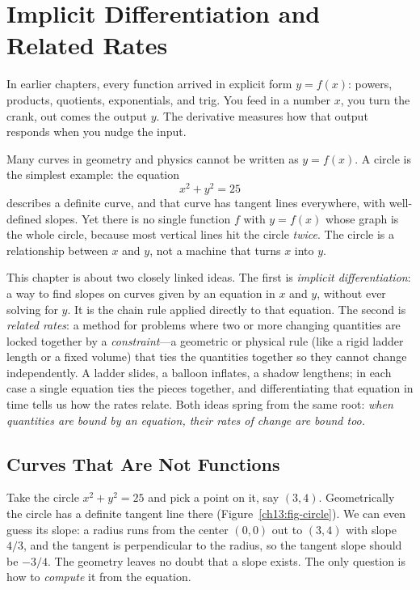 \chapter{Implicit Differentiation and Related Rates}

In earlier chapters, every function arrived in explicit form $y = f(x)$: powers,
products, quotients, exponentials, and trig. You feed in a number $x$, you turn the crank,
out comes the output $y$. The derivative measures how that output responds when you nudge
the input.

Many curves in geometry and physics cannot be written as $y = f(x)$. A circle is the
simplest example: the equation
\[
x^2 + y^2 = 25
\]
describes a definite curve, and that curve has tangent lines everywhere, with
well-defined slopes. Yet there is no single function $f$ with $y = f(x)$ whose graph is the
whole circle, because most vertical lines hit the circle \emph{twice}. The circle is a relationship
between $x$ and $y$, not a machine that turns $x$ into $y$.

This chapter is about two closely linked ideas. The first is \emph{implicit differentiation}: a way
to find slopes on curves given by an equation in $x$ and $y$, without ever solving for $y$. It is
the chain rule applied directly to that equation. The second is
\emph{related rates}: a method for problems where two or more changing quantities are locked together
by a \emph{constraint}---a geometric or physical rule (like a rigid ladder length or a fixed volume)
that ties the quantities together so they cannot change independently. A ladder slides, a balloon
inflates, a shadow lengthens; in each case a single equation ties the pieces together, and
differentiating that equation in time tells us how the rates relate. Both ideas spring from the same
root: \emph{when quantities are bound by an equation, their rates of change are bound too.}

\section{Curves That Are Not Functions}
\label{ch13:not-functions}

Take the circle $x^2 + y^2 = 25$ and pick a point on it, say $(3,4)$. Geometrically the
circle has a definite tangent line there (Figure~\ref{ch13:fig-circle}). We can even guess its slope: a radius runs from the
center $(0,0)$ out to $(3,4)$ with slope $4/3$, and the tangent is perpendicular to the radius, so
the tangent slope should be $-3/4$. The geometry leaves no doubt that a slope exists. The only
question is how to \emph{compute} it from the equation.

